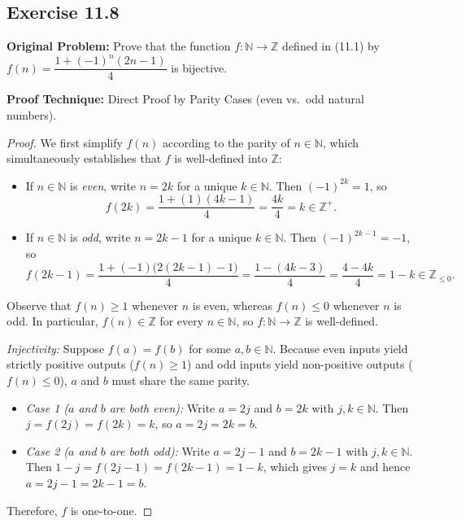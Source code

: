 \documentclass[11pt, letterpaper]{article}
\theoremstyle{definition}
\theoremstyle{remark}
\begin{document}
\subsection{Exercise 11.8}

\textbf{Original Problem:} Prove that the function $f : \mathbb{N} \to \mathbb{Z}$ defined in (11.1) by $f(n) = \dfrac{1 + (-1)^n (2n - 1)}{4}$ is bijective.

\textbf{Proof Technique:} Direct Proof by Parity Cases (even vs.\ odd natural numbers).

\begin{proof}
We first simplify $f(n)$ according to the parity of $n \in \mathbb{N}$, which simultaneously establishes that $f$ is well-defined into $\mathbb{Z}$:
\begin{itemize}
    \item If $n \in \mathbb{N}$ is \emph{even}, write $n = 2k$ for a unique $k \in \mathbb{N}$. Then $(-1)^{2k} = 1$, so
    \[
    f(2k) = \frac{1 + (1)(4k - 1)}{4} = \frac{4k}{4} = k \in \mathbb{Z}^+.
    \]
    \item If $n \in \mathbb{N}$ is \emph{odd}, write $n = 2k - 1$ for a unique $k \in \mathbb{N}$. Then $(-1)^{2k-1} = -1$, so
    \[
    f(2k - 1) = \frac{1 + (-1)\bigl(2(2k - 1) - 1\bigr)}{4} = \frac{1 - (4k - 3)}{4} = \frac{4 - 4k}{4} = 1 - k \in \mathbb{Z}_{\le 0}.
    \]
\end{itemize}
Observe that $f(n) \ge 1$ whenever $n$ is even, whereas $f(n) \le 0$ whenever $n$ is odd. In particular, $f(n) \in \mathbb{Z}$ for every $n \in \mathbb{N}$, so $f : \mathbb{N} \to \mathbb{Z}$ is well-defined.

\emph{Injectivity:} Suppose $f(a) = f(b)$ for some $a, b \in \mathbb{N}$. Because even inputs yield strictly positive outputs ($f(n) \ge 1$) and odd inputs yield non-positive outputs ($f(n) \le 0$), $a$ and $b$ must share the same parity.
\begin{itemize}
    \item \emph{Case 1 ($a$ and $b$ are both even):} Write $a = 2j$ and $b = 2k$ with $j, k \in \mathbb{N}$. Then $j = f(2j) = f(2k) = k$, so $a = 2j = 2k = b$.
    \item \emph{Case 2 ($a$ and $b$ are both odd):} Write $a = 2j - 1$ and $b = 2k - 1$ with $j, k \in \mathbb{N}$. Then $1 - j = f(2j - 1) = f(2k - 1) = 1 - k$, which gives $j = k$ and hence $a = 2j - 1 = 2k - 1 = b$.
\end{itemize}
Therefore, $f$ is one-to-one.


\end{proof}
\end{document}
